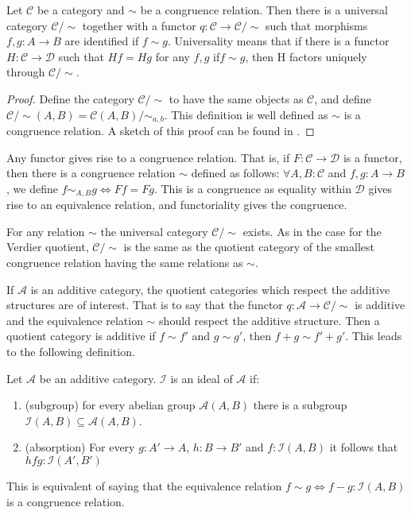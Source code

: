     \begin{prop}
        Let $\mathcal{C}$ be a category and $\sim$ be a congruence relation. Then there is a universal category $\mathcal{C}/\sim$ together with a functor $q:\mathcal{C}\rightarrow \mathcal{C}/\sim$ such that morphisms $f,g:A\rightarrow B$ are identified if $f\sim g$. Universality means that if there is a functor $H:\mathcal{C}\rightarrow \mathcal{D}$ such that $Hf=Hg$ for any $f,g$ if$f\sim g$, then H factors uniquely through $\mathcal{C}/\sim$.
    \end{prop}

    \begin{proof}
        Define the category $\mathcal{C}/\sim$ to have the same objects as $\mathcal{C}$, and define $\mathcal{C}/\sim (A,B)=\mathcal{C}(A,B)/\sim_{a,b}$. This definition is well defined as $\sim$ is a congruence relation. A sketch of this proof can be found in \cite{Mac71}.
    \end{proof}

    \begin{remark}
        Any functor gives rise to a congruence relation. That is, if $F:\mathcal{C}\rightarrow \mathcal{D}$ is a functor, then there is a congruence relation $\sim$ defined as follows: $\forall A,B:\mathcal{C}$ and $f,g:A\rightarrow B$, we define $f\sim_{A,B}g \iff Ff=Fg$. This is a congruence as equality within $\mathcal{D}$ gives rise to an equivalence relation, and functoriality gives the congruence.
    \end{remark}

    \begin{remark}
        For any relation $\sim$ the universal category $\mathcal{C}/\sim$ exists. As in the case for the Verdier quotient, $\mathcal{C}/\sim$ is the same as the quotient category of the smallest congruence relation having the same relations as $\sim$.
    \end{remark}

    If $\mathcal{A}$ is an additive category, the quotient categories which respect the additive structures are of interest. That is to say that the functor $q:\mathcal{A}\rightarrow \mathcal{C}/\sim$ is additive and the equivalence relation $\sim$ should respect the additive structure. Then a quotient category is additive if $f\sim f'$ and $g\sim g'$, then $f+g\sim f'+g'$. This leads to the following definition. 

    \begin{definition}
        Let $\mathcal{A}$ be an additive category. $\mathcal{I}$ is an ideal of $\mathcal{A}$ if:
        \begin{enumerate}
            \item (subgroup) for every abelian group $\mathcal{A}(A,B)$ there is a subgroup $\mathcal{I}(A,B)\subseteq\mathcal{A}(A,B)$.
            \item (absorption) For every $g:A'\rightarrow A$, $h:B\rightarrow B'$ and $f:\mathcal{I}(A,B)$ it follows that $hfg:\mathcal{I}(A',B')$
        \end{enumerate}
        This is equivalent of saying that the equivalence relation $f\sim g \iff f-g:\mathcal{I}(A,B)$ is a congruence relation.
    \end{definition}

